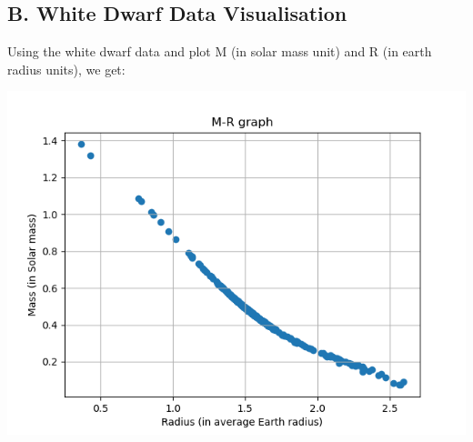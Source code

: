 \documentclass{article}
\begin{document}
\newpage
\subsection*{B. White Dwarf Data Visualisation}
Using the white dwarf data and plot M (in solar mass unit) and R (in earth radius units), we get:
\begin{center}
    \includegraphics[scale=0.65]{images_newton/1_M_vs_R_fitered.png}
\end{center}
\end{document}
